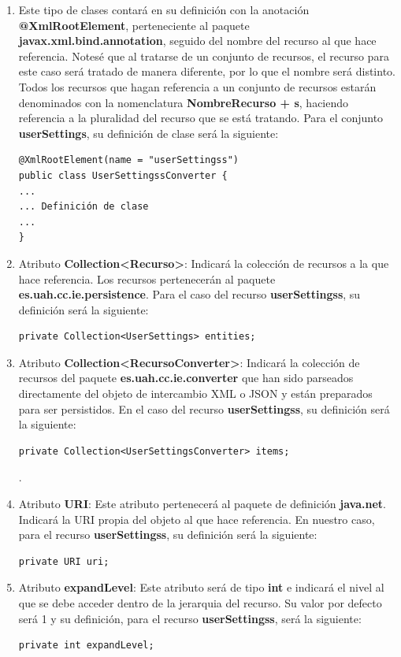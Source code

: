 \begin{enumerate}
\item Este tipo de clases contará en su definición con la anotación \textbf{@XmlRootElement}, perteneciente al paquete \textbf{javax.xml.bind.annotation}, seguido del nombre del recurso al que hace referencia. Notesé que al tratarse de un conjunto de recursos, el recurso para este caso será tratado de manera diferente, por lo que el nombre será distinto. Todos los recursos que hagan referencia a un conjunto de recursos estarán denominados con la nomenclatura \textbf{NombreRecurso + s}, haciendo referencia a la pluralidad del recurso que se está tratando. Para el conjunto \textbf{userSettings}, su definición de clase será la siguiente:
\begin{verbatim}
@XmlRootElement(name = "userSettingss")
public class UserSettingssConverter {
...
... Definición de clase
...
}
\end{verbatim} 
\item Atributo \textbf{Collection<Recurso>}: Indicará la colección de recursos a la que hace referencia. Los recursos pertenecerán al paquete \textbf{es.uah.cc.ie.persistence}. Para el caso del recurso \textbf{userSettingss}, su definición será la siguiente: \begin{verbatim}private Collection<UserSettings> entities;\end{verbatim}
\item Atributo \textbf{Collection<RecursoConverter>}: Indicará la colección de recursos del paquete \textbf{es.uah.cc.ie.converter} que han sido parseados directamente del objeto de intercambio XML o JSON y están preparados para ser persistidos. En el caso del recurso \textbf{userSettingss}, su definición será la siguiente: \begin{verbatim}private Collection<UserSettingsConverter> items;\end{verbatim}.
\item Atributo \textbf{URI}: Este atributo pertenecerá al paquete de definición \textbf{java.net}. Indicará la URI propia del objeto al que hace referencia. En nuestro caso, para el recurso \textbf{userSettingss}, su definición será la siguiente: \begin{verbatim}private URI uri;\end{verbatim}
\item Atributo \textbf{expandLevel}: Este atributo será de tipo \textbf{int} e indicará el nivel al que se debe acceder dentro de la jerarquia del recurso. Su valor por defecto será 1 y su definición, para el recurso \textbf{userSettingss}, será la siguiente:\begin{verbatim}private int expandLevel;\end{verbatim}

\end{enumerate}
